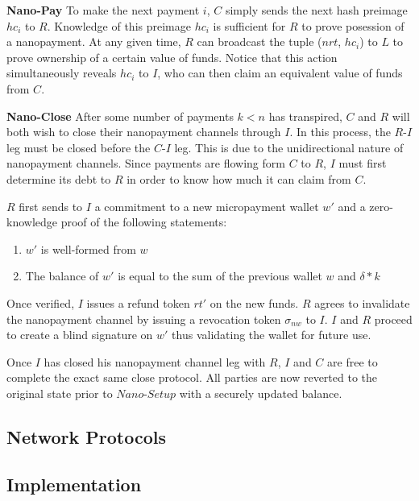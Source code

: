 \textbf{Nano-Pay} To make the next payment $i$, $C$ simply sends the next hash preimage $hc_i$ to
$R$. Knowledge of this preimage $hc_i$ is sufficient for $R$ to prove posession
of a nanopayment. At any given time, $R$ can broadcast the tuple ($nrt$, $hc_i$)
to $L$ to prove ownership of a certain value of funds. Notice that this action
simultaneously reveals $hc_i$ to $I$, who can then claim an equivalent value of
funds from $C$.

\textbf{Nano-Close} After some number of payments $k < n$ has transpired, $C$ and $R$ will both wish
to close their nanopayment channels through $I$. In this process, the $R$-$I$ leg
must be closed before the $C$-$I$ leg. This is due to the unidirectional nature
of nanopayment channels. Since payments are flowing form $C$ to $R$, $I$ must
first determine its debt to $R$ in order to know how much it can claim from $C$.

$R$ first sends to $I$ a commitment to a new micropayment wallet $w'$ and a
zero-knowledge proof of the following statements:

\begin{enumerate}
\item $w'$ is well-formed from $w$
\item The balance of $w'$ is equal to the sum of the previous wallet $w$ and
  $\delta * k$
\end{enumerate}

Once verified, $I$ issues a refund token $rt'$ on the new funds. $R$ agrees to
invalidate the nanopayment channel by issuing a revocation token $\sigma_{nw}$
to $I$. $I$ and $R$ proceed to create a blind signature on $w'$ thus validating
the wallet for future use.

Once $I$ has closed his nanopayment channel leg with $R$, $I$ and $C$ are free
to complete the exact same close protocol. All parties are now reverted to the
original state prior to $Nano$-$Setup$ with a securely updated balance.

\subsection{Network Protocols}
\subsection{Implementation}
